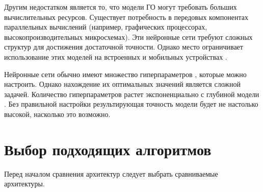 Другим недостатком является то, что модели ГО могут требовать больших вычислительных ресурсов. Существует потребность в передовых компонентах параллельных вычислений (например, графических процессорах, высокопроизводительных микросхемах). Эти нейронные сети требуют сложных структур для достижения достаточной точности. Однако место ограничивает использование этих моделей на встроенных и мобильных устройствах \cite{deeplearninmob}.

Нейронные сети обычно имеют множество гиперпараметров \cite{giperparams}, которые можно настроить. Однако нахождение их оптимальных значений является сложной задачей. Количество гиперпараметров растет экспоненциально с глубиной модели \cite{deeplearninmob}. Без правильной настройки результирующая точность модели будет не настолько высокой, насколько это возможно.


\section{Выбор подходящих алгоритмов}

Перед началом сравнения архитектур следует выбрать сравниваемые архитектуры.


